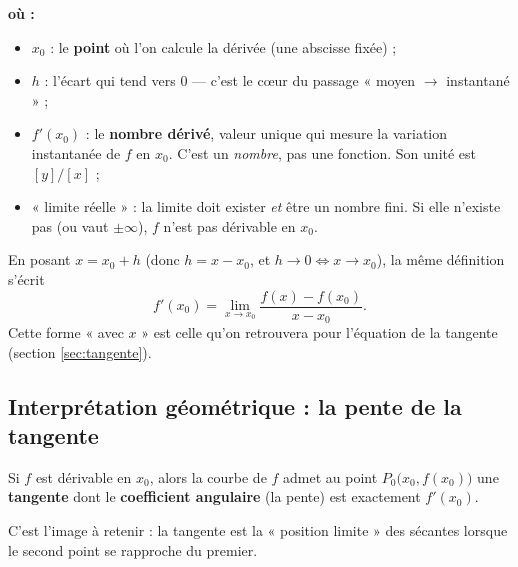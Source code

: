 \documentclass[11pt,a4paper]{article}
\newenvironment{ou}{%
  \par\smallskip\noindent\textbf{où :}\nopagebreak
  \begin{itemize}[leftmargin=1.8em,topsep=2pt,itemsep=1.5pt,parsep=0pt]}%
  {\end{itemize}}
\begin{document}
\begin{ou}
  \item $x_0$ : le \textbf{point} où l'on calcule la dérivée (une abscisse fixée) ;
  \item $h$ : l'écart qui tend vers $0$ — c'est le c\oe ur du passage « moyen $\to$ instantané » ;
  \item $f'(x_0)$ : le \textbf{nombre dérivé}, valeur unique qui mesure la variation instantanée de $f$
        en $x_0$. C'est un \emph{nombre}, pas une fonction. Son unité est $[y]/[x]$ ;
  \item « limite réelle » : la limite doit exister \emph{et} être un nombre fini. Si elle n'existe pas
        (ou vaut $\pm\infty$), $f$ n'est pas dérivable en $x_0$.
\end{ou}

\begin{remarque}
En posant $x=x_0+h$ (donc $h=x-x_0$, et $h\to 0 \Leftrightarrow x\to x_0$), la même définition s'écrit
\[
   f'(x_0)=\lim_{x\to x_0}\frac{f(x)-f(x_0)}{x-x_0}.
\]
Cette forme « avec $x$ » est celle qu'on retrouvera pour l'équation de la tangente (section \ref{sec:tangente}).
\end{remarque}

\subsection{Interprétation géométrique : la pente de la tangente}

\begin{theoreme}[Nombre dérivé = pente de la tangente]
Si $f$ est dérivable en $x_0$, alors la courbe de $f$ admet au point $P_0\big(x_0,f(x_0)\big)$ une
\textbf{tangente} dont le \textbf{coefficient angulaire} (la pente) est exactement $f'(x_0)$.
\end{theoreme}

C'est l'image à retenir : la tangente est la « position limite » des sécantes lorsque le second point
se rapproche du premier.
\end{document}
